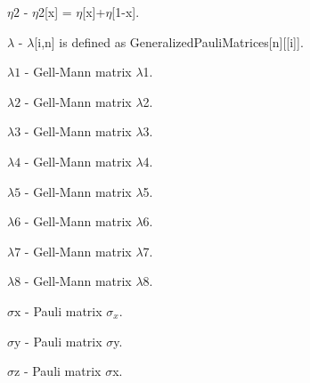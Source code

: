 \documentclass[a4paper,12pt]{article}
\begin{document}
\textbf{$ \text{$\eta $2} $ } - $\eta $2[x] = $\eta $[x]+$\eta $[1-x].$  $

\textbf{$ \lambda  $ } - $\lambda $[i,n] is defined as GeneralizedPauliMatrices[n][[i]].$  $

\textbf{$ \text{$\lambda $1} $ } - Gell-Mann matrix $\lambda $1.$  $

\textbf{$ \text{$\lambda $2} $ } - Gell-Mann matrix $\lambda $2.$  $

\textbf{$ \text{$\lambda $3} $ } - Gell-Mann matrix $\lambda $3.$  $

\textbf{$ \text{$\lambda $4} $ } - Gell-Mann matrix $\lambda $4.$  $

\textbf{$ \text{$\lambda $5} $ } - Gell-Mann matrix $\lambda $5.$  $

\textbf{$ \text{$\lambda $6} $ } - Gell-Mann matrix $\lambda $6.$  $

\textbf{$ \text{$\lambda $7} $ } - Gell-Mann matrix $\lambda $7.$  $

\textbf{$ \text{$\lambda $8} $ } - Gell-Mann matrix $\lambda $8.$  $

\textbf{$ \text{$\sigma $x} $ } - Pauli matrix $ \sigma _x. $

\textbf{$ \text{$\sigma $y} $ } - Pauli matrix $\sigma $y.$  $

\textbf{$ \text{$\sigma $z} $ } - Pauli matrix $\sigma $x.$  $
\end{document}
